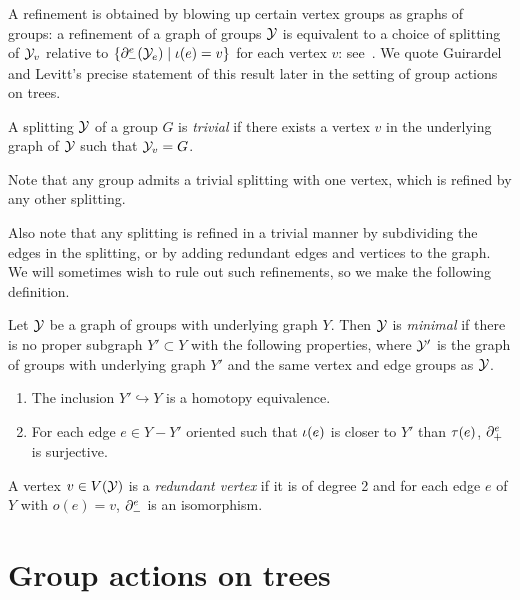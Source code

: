 \begin{remark}
  A refinement is obtained by blowing up certain vertex groups as graphs of groups: a refinement of a graph of groups $\mathcal{Y}$ is equivalent to a choice of splitting of $\mathcal{Y}_v$ relative to $\{\partial^e_{-}(\mathcal{Y}_e) \mid \operatorname{\iota}(e) = v\}$ for each vertex $v$: see~\cite[Lemma 4.12]{guirardellevitt17}.
  We quote Guirardel and Levitt's precise statement of this result later in the setting of group actions on trees.
\end{remark}

\begin{definition}
  A splitting $\mathcal{Y}$ of a group $G$ is \emph{trivial} if there exists a vertex $v$ in the underlying graph of $\mathcal{Y}$ such that $\mathcal{Y}_v = G$.
\end{definition}

Note that any group admits a trivial splitting with one vertex, which is refined by any other splitting.

Also note that any splitting is refined in a trivial manner by subdividing the edges in the splitting, or by adding redundant edges and vertices to the graph.
We will sometimes wish to rule out such refinements, so we make the following definition. 

\begin{definition}\label{definition:minimality}
  Let $\mathcal{Y}$ be a graph of groups with underlying graph $Y$.
  Then $\mathcal{Y}$ is \emph{minimal} if there is no proper subgraph $Y' \subset Y$ with the following properties, where $\mathcal{Y}'$ is the graph of groups with underlying graph $Y'$ and the same vertex and edge groups as $\mathcal{Y}$.
  \begin{enumerate}
    \item The inclusion $Y' \hookrightarrow Y$ is a homotopy equivalence.
    \item For each edge $e \in Y - Y'$ oriented such that $\operatorname{\iota}(e)$ is closer to $Y'$ than $\operatorname{\tau}(e)$, $\partial^e_{+}$ is surjective.
  \end{enumerate}

  A vertex $v \in V(\mathcal{Y})$ is a \emph{redundant vertex} if it is of degree 2 and for each edge $e$ of $Y$ with $o(e) = v$, $\partial^e_{-}$ is an isomorphism.
\end{definition}

\section{Group actions on trees}\label{sec:actions_on_trees}

